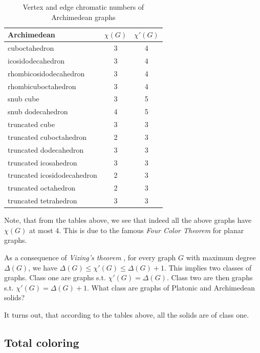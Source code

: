 \begin{table}[H]
    \centering
    \label{tab:archimedean-chrom-nums}
    \begin{tabular}{|l|c|c|}
    \hline
    Archimedean & $\chi(G)$ & $\chi'(G)$ \\
    \hline\hline
    cuboctahedron & 3 & 4 \\
    \hline
    icosidodecahedron & 3 & 4 \\
    \hline
    rhombicosidodecahedron & 3 & 4 \\
    \hline
    rhombicuboctahedron & 3 & 4 \\
    \hline
    snub cube & 3 & 5 \\
    \hline
    snub dodecahedron & 4 & 5 \\
    \hline
    truncated cube & 3 & 3 \\
    \hline
    truncated cuboctahedron & 2 & 3 \\
    \hline
    truncated dodecahedron & 3 & 3 \\
    \hline
    truncated icosahedron & 3 & 3 \\
    \hline
    truncated icosidodecahedron & 2 & 3 \\
    \hline
    truncated octahedron & 2 & 3 \\
    \hline
    truncated tetrahedron & 3 & 3 \\
    \hline
    \end{tabular}
    \caption{Vertex and edge chromatic numbers of Archimedean graphs}
\end{table}

Note, that from the tables above, we see that indeed all the above graphs have $\chi(G)$ at most 4. This is due to the famous \textit{Four Color Theorem} \cite{appelhaken76} for planar graphs.

\begin{highlight}
As a consequence of \textit{Vizing's theorem} \cite{misra92}, for every graph $G$ with maximum degree $\Delta(G)$, we have $\Delta(G) \leq \chi'(G) \leq \Delta(G) + 1$. This implies two classes of graphs. Class one are graphs s.t. $\chi'(G) = \Delta(G)$. Class two are then graphs s.t. $\chi'(G) = \Delta(G) + 1$. What class are graphs of Platonic and Archimedean solids?

It turns out, that according to the tables above, all the solids are of class one.
\end{highlight}

\subsection{Total coloring}

